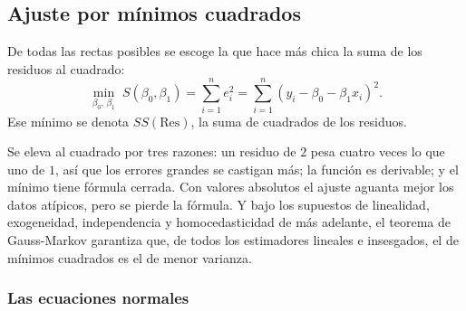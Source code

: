 \documentclass[11pt,letterpaper]{article}
\begin{document}

\subsection*{Ajuste por mínimos cuadrados}

De todas las rectas posibles se escoge la que hace más chica la suma
de los residuos al cuadrado:
\[
    \min_{\beta_0,\, \beta_1}\;
    S(\beta_0, \beta_1) = \sum_{i=1}^{n} e_i^2
    = \sum_{i=1}^{n} (y_i - \beta_0 - \beta_1 x_i)^2 .
\]
Ese mínimo se denota $SS(\mathrm{Res})$, la suma de cuadrados de los
residuos.

Se eleva al cuadrado por tres razones: un residuo de $2$ pesa cuatro
veces lo que uno de $1$, así que los errores grandes se castigan más;
la función es derivable; y el mínimo tiene fórmula cerrada. Con valores
absolutos el ajuste aguanta mejor los datos atípicos, pero se pierde la
fórmula. Y bajo los supuestos de linealidad, exogeneidad, independencia
y homocedasticidad de más adelante, el teorema de Gauss-Markov
garantiza que, de todos los estimadores lineales e insesgados, el de
mínimos cuadrados es el de menor varianza.

\subsubsection*{Las ecuaciones normales}
\end{document}
